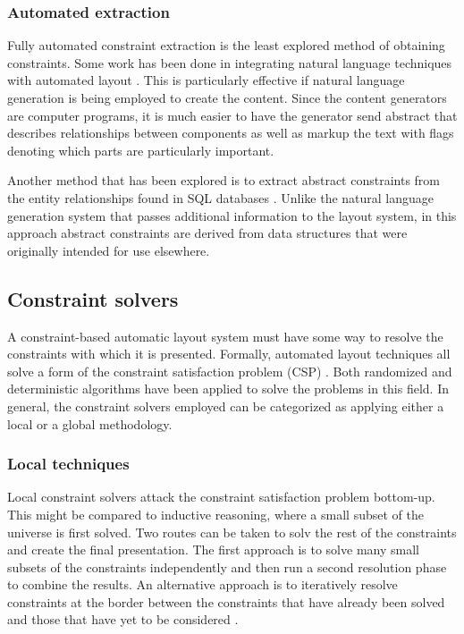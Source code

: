     \subsubsection{Automated extraction}

		Fully automated constraint extraction is the least explored method of
		obtaining constraints. Some work has been done in integrating natural
		language techniques with automated layout \citep{roth-2}. This is
		particularly effective if natural language generation is being employed to
		create the content. Since the content generators are computer programs, it
		is much easier to have the generator send abstract that describes
		relationships between components as well as markup the text with flags
		denoting which parts are particularly important.

		Another method that has been explored is to extract abstract constraints
		from the entity relationships found in SQL databases \citep{pizano-1}.
		Unlike the natural language generation system that passes additional
		information to the layout system, in this approach abstract constraints are
		derived from data structures that were originally intended for use
		elsewhere.

    \subsection{Constraint solvers}

		A constraint-based automatic layout system must have some way to resolve
		the constraints with which it is presented. Formally, automated layout
		techniques all solve a form of the constraint satisfaction problem (CSP)
		\citep{mackworth-2,mackworth-1}. Both randomized and deterministic
		algorithms have been applied to solve the problems in this field. In
		general, the constraint solvers employed can be categorized as applying
		either a local or a global methodology.

    \subsubsection{Local techniques}

		Local constraint solvers attack the constraint satisfaction problem
		bottom-up. This might be compared to inductive reasoning, where a small
		subset of the universe is first solved. Two routes can be taken to solv the
		rest of the constraints and create the final presentation. The first
		approach is to solve many small subsets of the constraints independently
		and then run a second resolution phase to combine the results. An
		alternative approach is to iteratively resolve constraints at the border
		between the constraints that have already been solved and those that have
		yet to be considered \citep{nilsson-1}.

